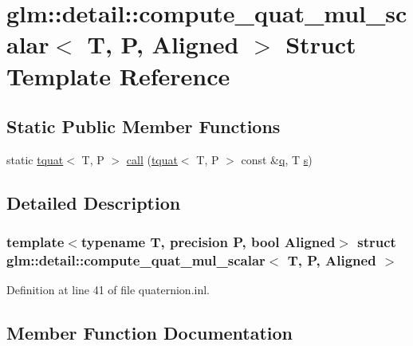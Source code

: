 \hypertarget{structglm_1_1detail_1_1compute__quat__mul__scalar}{}\section{glm\+::detail\+::compute\+\_\+quat\+\_\+mul\+\_\+scalar$<$ T, P, Aligned $>$ Struct Template Reference}
\label{structglm_1_1detail_1_1compute__quat__mul__scalar}
\subsection*{Static Public Member Functions}
\begin{DoxyCompactItemize}
\item 
static \mbox{\hyperlink{structglm_1_1tquat}{tquat}}$<$ T, P $>$ \mbox{\hyperlink{structglm_1_1detail_1_1compute__quat__mul__scalar_a67ddc713e670e348caba9de92480446f}{call}} (\mbox{\hyperlink{structglm_1_1tquat}{tquat}}$<$ T, P $>$ const \&\mbox{\hyperlink{glad_8h_a514729309336df22bcc8eda979d6ced4}{q}}, T \mbox{\hyperlink{glad_8h_af1b1d5edfea6a34daee7389b1b5810ad}{s}})
\end{DoxyCompactItemize}


\subsection{Detailed Description}
\subsubsection*{template$<$typename T, precision P, bool Aligned$>$\newline
struct glm\+::detail\+::compute\+\_\+quat\+\_\+mul\+\_\+scalar$<$ T, P, Aligned $>$}



Definition at line 41 of file quaternion.\+inl.



\subsection{Member Function Documentation}
\mbox{\label{structglm_1_1detail_1_1compute__quat__mul__scalar_a67ddc713e670e348caba9de92480446f}} 
